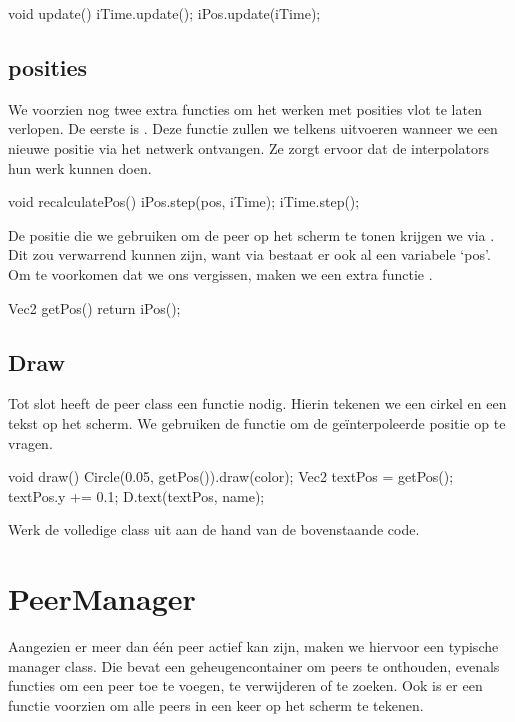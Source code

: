 \begin{code}
void update()
{
	iTime.update();
	iPos.update(iTime);
}
\end{code}

\subsection{posities}
We voorzien nog twee extra functies om het werken met posities vlot te laten verlopen. De eerste is . Deze functie zullen we telkens uitvoeren wanneer we een nieuwe positie via het netwerk ontvangen. Ze zorgt ervoor dat de interpolators hun werk kunnen doen.

\begin{code}
void recalculatePos()
{
	iPos.step(pos, iTime);
	iTime.step();
}
\end{code}

De positie die we gebruiken om de peer op het scherm te tonen krijgen we via . Dit zou verwarrend kunnen zijn, want via  bestaat er ook al een variabele `pos'. Om te voorkomen dat we ons vergissen, maken we een extra functie .

\begin{code}
Vec2 getPos()
{
	return iPos();
}
\end{code}

\subsection{Draw}
Tot slot heeft de peer class een  functie nodig. Hierin tekenen we een cirkel en een tekst op het scherm. We gebruiken de functie  om de ge\"interpoleerde positie op te vragen.

\begin{code}
void draw()
{
	Circle(0.05, getPos()).draw(color);
	Vec2 textPos = getPos();
	textPos.y += 0.1;
	D.text(textPos, name);
}
\end{code}

\begin{exercise}
Werk de volledige  class uit aan de hand van de bovenstaande code.
\end{exercise}

\section{PeerManager}

Aangezien er meer dan \'e\'en peer actief kan zijn, maken we hiervoor een typische manager class. Die bevat een geheugencontainer om peers te onthouden, evenals functies om een peer toe te voegen, te verwijderen of te zoeken. Ook is er een functie voorzien om alle peers in een keer op het scherm te tekenen.

